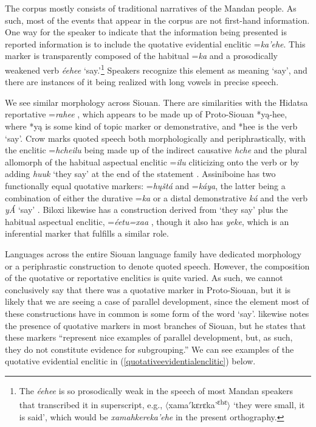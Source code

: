 The corpus mostly consists of traditional narratives of the Mandan people. As such, most of the events that appear in the corpus are not first-hand information. One way for the speaker to indicate that the information being presented is reported information is to include the quotative evidential enclitic =\textit{ka'ehe}. This marker is transparently composed of the habitual =\textit{ka} and a prosodically weakened verb \textit{éehee} `say.'\footnote{The \textit{éehee} is so prosodically weak in the speech of most Mandan speakers that \citet[19]{kennard1936} transcribed it in superscript, e.g., $\langle$xama$'$kɛrɛka'\textsuperscript{ɛhɛ}$\rangle$ `they were small, it is said', which would be \textit{xamahkereka'ehe} in the present orthography.} Speakers recognize this element as meaning `say', and there are instances of it being realized with long vowels in precise speech.

We see similar morphology across Siouan. There are similarities with the Hidatsa reportative =\textit{rahee} \citep [194]{boyle2007}, which appears to be made up of Proto-Siouan *yą-hee, where *yą is some kind of topic marker or demonstrative, and *hee is the verb `say'. Crow marks quoted speech both morphologically and periphrastically, with the enclitic =\textit{hcheilu} being made up of the indirect causative \textit{hche} and the plural allomorph of the habitual aspectual enclitic =\textit{ilu} cliticizing onto the verb or by adding \textit{huuk} `they say' at the end of the statement \citep[397]{graczyk2007}. Assiniboine has two functionally equal quotative markers: =\textit{hųštá} and =\textit{káya}, the latter being a combination of either the durative =\textit{ka} or a distal demonstrative \textit{ká} and the verb \textit{yÁ} `say' \citep[357]{cumberland2005}. Biloxi likewise has a construction derived from `they say' plus the habitual aspectual enclitic, =\textit{éetu=xaa} \citep[189]{dorseyswanton1912}, though it also has \textit{yeke}, which is an inferential marker that fulfills a similar role.

Languages across the entire Siouan language family have dedicated morphology or a periphrastic construction to denote quoted speech. However, the composition of the quotative or reportative enclitics is quite varied. As such, we cannot conclusively say that there was a quotative marker in Proto-Siouan, but it is likely that we are seeing a case of parallel development, since the element most of these constructions have in common is some form of the word `say'.  \citet[12]{rankin2010} likewise notes the presence of quotative markers in most branches of Siouan, but he states that these markers ``represent nice examples of parallel development, but, as such, they do not constitute evidence for subgrouping.'' We can see examples of the quotative evidential enclitic in (\ref{quotativeevidentialenclitic}) below.

